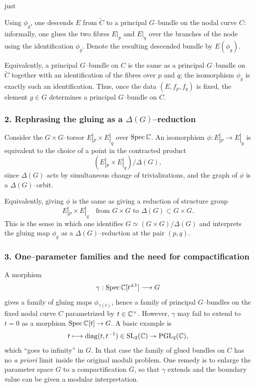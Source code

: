 just \documentclass[12pt]{article}
\begin{document}
Using $\phi_g$, one descends $E$ from $\widetilde C$ to a principal $G$--bundle
on the nodal curve $C$: informally, one glues the two fibres $E|_p$ and $E|_q$
over the branches of the node using the identification $\phi_g$.  Denote the
resulting descended bundle by $E(\phi_g)$.

Equivalently, a principal $G$--bundle on $C$ is the same as a principal $G$--bundle
on $\widetilde C$ together with an identification of the fibres over $p$ and $q$;
the isomorphism $\phi_g$ is exactly such an identification.  Thus, once the data
$(E,f_p,f_q)$ is fixed, the element $g\in G$ determines a principal $G$--bundle
on $C$.

\subsubsection*{2. Rephrasing the gluing as a $\Delta(G)$--reduction}

Consider the $G\times G$--torsor $E|_p\times E|_q$ over $\operatorname{Spec}\mathbb{C}$.
An isomorphism $\phi:E|_p\to E|_q$ is equivalent to the choice of a point in the
contracted product
\[
(E|_p\times E|_q)/\Delta(G),
\]
since $\Delta(G)$ acts by simultaneous change of trivializations, and the graph
of $\phi$ is a $\Delta(G)$--orbit.

Equivalently, giving $\phi$ is the same as giving a reduction of structure group
\[
E|_p\times E|_q
\quad\text{from }G\times G\text{ to }\Delta(G)\subset G\times G.
\]
This is the sense in which one identifies $G\simeq (G\times G)/\Delta(G)$ and
interprets the gluing map $\phi_g$ as a $\Delta(G)$--reduction at the pair
$(p,q)$.

\subsubsection*{3. One--parameter families and the need for compactification}

A morphism
\[
\gamma:\operatorname{Spec}\mathbb{C}[t^{\pm 1}]\longrightarrow G
\]
gives a family of gluing maps $\phi_{\gamma(t)}$, hence a family of principal
$G$--bundles on the fixed nodal curve $C$ parametrized by $t\in\mathbb{C}^\times$.
However, $\gamma$ may fail to extend to $t=0$ as a morphism
$\operatorname{Spec}\mathbb{C}[t]\to G$.  A basic example is
\[
t\longmapsto \operatorname{diag}(t,t^{-1})\in \operatorname{SL}_2(\mathbb{C})\twoheadrightarrow \operatorname{PGL}_2(\mathbb{C}),
\]
which ``goes to infinity'' in $G$.  In that case the family of glued bundles on
$C$ has no \emph{a priori} limit inside the original moduli problem.  One remedy
is to enlarge the parameter space $G$ to a compactification $\overline G$, so
that $\gamma$ extends and the boundary value can be given a modular
interpretation.
\end{document}
